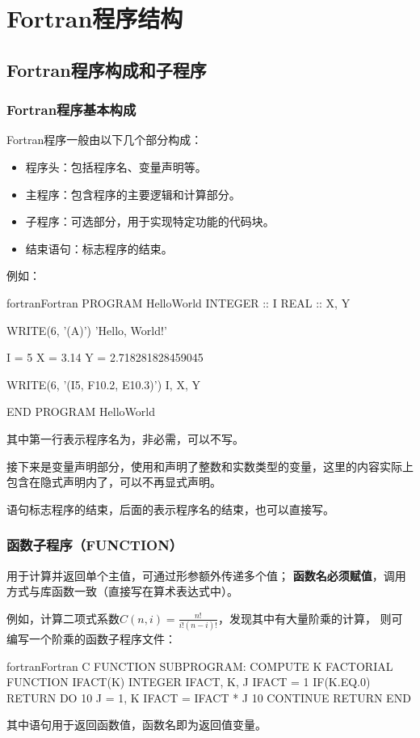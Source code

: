 \section{Fortran程序结构}
\subsection{Fortran程序构成和子程序}

\subsubsection{Fortran程序基本构成}
Fortran程序一般由以下几个部分构成：
\begin{itemize}
      \item 程序头：包括程序名、变量声明等。
      \item 主程序：包含程序的主要逻辑和计算部分。
      \item 子程序：可选部分，用于实现特定功能的代码块。
      \item 结束语句：标志程序的结束。
\end{itemize}
例如：
\begin{envcode}{fortran}{Fortran}
      PROGRAM HelloWorld
      INTEGER :: I
      REAL :: X, Y
      
      WRITE(6, '(A)') 'Hello, World!'
      
      I = 5
      X = 3.14
      Y = 2.718281828459045
      
      WRITE(6, '(I5, F10.2, E10.3)') I, X, Y
      
      END PROGRAM HelloWorld
\end{envcode}

其中第一行表示程序名为，非必需，可以不写。

接下来是变量声明部分，使用和声明了整数和实数类型的变量，这里的内容实际上包含在隐式声明内了，可以不再显式声明。

语句标志程序的结束，后面的表示程序名的结束，也可以直接写。

\subsubsection{函数子程序（FUNCTION）}

用于计算并返回单个主值，可通过形参额外传递多个值；
\textbf{函数名必须赋值}，调用方式与库函数一致（直接写在算术表达式中）。

例如，计算二项式系数$C(n,i) = \frac{n!}{i!(n-i)!}$，发现其中有大量阶乘的计算，
则可编写一个阶乘的函数子程序文件：
\begin{envcode}{fortran}{Fortran}
C FUNCTION SUBPROGRAM: COMPUTE K FACTORIAL
      FUNCTION IFACT(K)
      INTEGER IFACT, K, J
      IFACT = 1
      IF(K.EQ.0) RETURN
      DO 10 J = 1, K
          IFACT = IFACT * J
10    CONTINUE
      RETURN
      END
\end{envcode}
其中语句用于返回函数值，函数名即为返回值变量。

